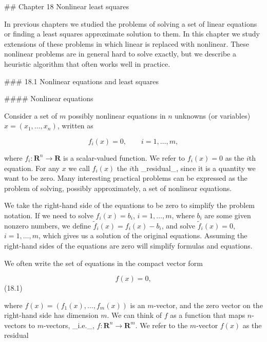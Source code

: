 

## Chapter 18 Nonlinear least squares

In previous chapters we studied the problems of solving a set of linear equations or finding a least squares approximate solution to them. In this chapter we study extensions of these problems in which linear is replaced with nonlinear. These nonlinear problems are in general hard to solve exactly, but we describe a heuristic algorithm that often works well in practice.

### 18.1 Nonlinear equations and least squares

#### Nonlinear equations

Consider a set of \(m\) possibly nonlinear equations in \(n\) unknowns (or variables) \(x=(x_{1},\ldots,x_{n})\), written as

\[f_{i}(x)=0,\qquad i=1,\ldots,m,\]

where \(f_{i}:\mathbf{R}^{n}\rightarrow\mathbf{R}\) is a scalar-valued function. We refer to \(f_{i}(x)=0\) as the \(i\)th equation. For any \(x\) we call \(f_{i}(x)\) the \(i\)th _residual_, since it is a quantity we want to be zero. Many interesting practical problems can be expressed as the problem of solving, possibly approximately, a set of nonlinear equations.

We take the right-hand side of the equations to be zero to simplify the problem notation. If we need to solve \(f_{i}(x)=b_{i}\), \(i=1,\ldots,m\), where \(b_{i}\) are some given nonzero numbers, we define \(\tilde{f}_{i}(x)=f_{i}(x)-b_{i}\), and solve \(\tilde{f}_{i}(x)=0\), \(i=1,\ldots,m\), which gives us a solution of the original equations. Assuming the right-hand sides of the equations are zero will simplify formulas and equations.

We often write the set of equations in the compact vector form

\[f(x)=0,\] (18.1)

where \(f(x)=(f_{1}(x),\ldots,f_{m}(x))\) is an \(m\)-vector, and the zero vector on the right-hand side has dimension \(m\). We can think of \(f\) as a function that maps \(n\)-vectors to \(m\)-vectors, _i.e._, \(f:\mathbf{R}^{n}\rightarrow\mathbf{R}^{m}\). We refer to the \(m\)-vector \(f(x)\) as the residual